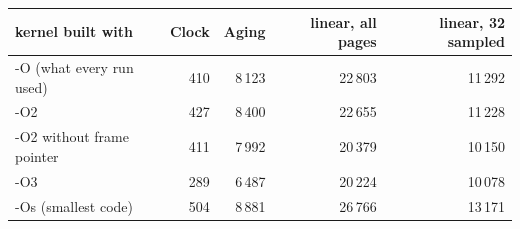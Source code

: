\begin{tabular}{lrrrr}
\toprule
kernel built with & Clock & Aging & linear, all pages & linear, 32 sampled \\
\midrule
-O (what every run used) & 410 & 8\,123 & 22\,803 & 11\,292 \\
-O2 & 427 & 8\,400 & 22\,655 & 11\,228 \\
-O2 without frame pointer & 411 & 7\,992 & 20\,379 & 10\,150 \\
-O3 & 289 & 6\,487 & 20\,224 & 10\,078 \\
-Os (smallest code) & 504 & 8\,881 & 26\,766 & 13\,171 \\
\bottomrule
\end{tabular}
